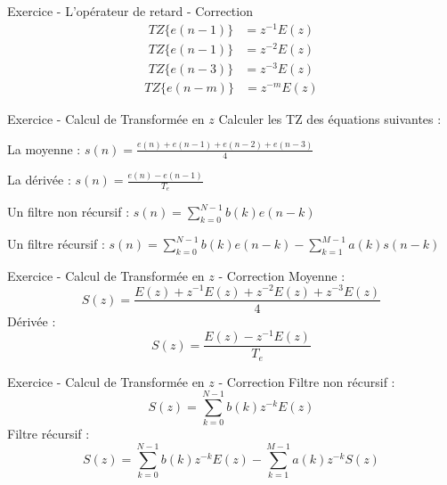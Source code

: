 \documentclass{beamer}
\newcounter{exampleBlockCounter}
\begin{document}
\begin{frame}
\begin{exampleblock}{Exercice  - L'opérateur de retard - Correction}
\begin{align*}
TZ\{e(n-1)\} &= z^{-1}E(z)
\end{align*}
\pause
\begin{align*}
TZ\{ e(n-1)\} &= z^{-2}E(z)\\
TZ\{ e(n-3)\} &= z^{-3}E(z)
\end{align*}
\pause
\begin{align*}
TZ\{ e(n-m)\} &= z^{-m}E(z)
\end{align*}
\end{exampleblock}
\end{frame}


\begin{frame}
\begin{exampleblock}{Exercice  - Calcul de Transformée en $z$}
	\justifying
	Calculer les TZ des équations suivantes :
	\itemize
	\item La moyenne : $s(n) = \frac{e(n) + e(n-1) + e(n-2) + e(n-3)}{4}$
	\item La dérivée : $s(n) = \frac{e(n) - e(n-1)}{T_e}$
	\item Un filtre non récursif : $s(n)=\sum_{k=0}^{N-1}b(k)e(n-k)$
	\item Un filtre récursif : $s(n)=\sum_{k=0}^{N-1}b(k)e(n-k) -
	\sum_{k=1}^{M-1}a(k)s(n-k)$
\end{exampleblock}
\end{frame}

\begin{frame}
\begin{exampleblock}{Exercice  - Calcul de Transformée en $z$ - Correction}
Moyenne :
$$
S(z)=\frac{E(z)+z^{-1}E(z)+z^{-2}E(z)+z^{-3}E(z)}{4}
$$
\pause
Dérivée :
$$
S(z)=\frac{E(z)-z^{-1}E(z)}{T_e}
$$
\end{exampleblock}
\end{frame}

\begin{frame}
\begin{exampleblock}{Exercice  - Calcul de Transformée en $z$ - Correction}
Filtre non récursif :
$$
S(z)=\sum_{k=0}^{N-1}b(k)z^{-k}E(z)
$$
\pause
Filtre récursif :
$$
S(z)=\sum_{k=0}^{N-1}b(k)z^{-k}E(z) - \sum_{k=1}^{M-1}a(k)z^{-k}S(z)
$$
\end{exampleblock}
\end{frame}
\end{document}
